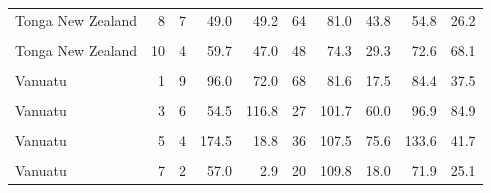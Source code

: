 \begin{ThreePartTable}
\begin{longtable}[t]{lrrrrrrrrr}
Tonga New Zealand & 8 & 7 & 49.0 & 49.2 & 64 & 81.0 & 43.8 & 54.8 & 26.2\\
\cellcolor{gray!6}{Tonga New Zealand} & \cellcolor{gray!6}{9} & \cellcolor{gray!6}{4} & \cellcolor{gray!6}{31.1} & \cellcolor{gray!6}{23.2} & \cellcolor{gray!6}{58} & \cellcolor{gray!6}{73.8} & \cellcolor{gray!6}{34.8} & \cellcolor{gray!6}{47.5} & \cellcolor{gray!6}{36.2}\\
Tonga New Zealand & 10 & 4 & 59.7 & 47.0 & 48 & 74.3 & 29.3 & 72.6 & 68.1\\
\cellcolor{gray!6}{Tonga New Zealand} & \cellcolor{gray!6}{11} & \cellcolor{gray!6}{5} & \cellcolor{gray!6}{31.8} & \cellcolor{gray!6}{19.7} & \cellcolor{gray!6}{52} & \cellcolor{gray!6}{79.3} & \cellcolor{gray!6}{33.4} & \cellcolor{gray!6}{57.3} & \cellcolor{gray!6}{34.9}\\
Vanuatu & 1 & 9 & 96.0 & 72.0 & 68 & 81.6 & 17.5 & 84.4 & 37.5\\
\cellcolor{gray!6}{Vanuatu} & \cellcolor{gray!6}{2} & \cellcolor{gray!6}{4} & \cellcolor{gray!6}{91.4} & \cellcolor{gray!6}{32.7} & \cellcolor{gray!6}{47} & \cellcolor{gray!6}{103.9} & \cellcolor{gray!6}{56.5} & \cellcolor{gray!6}{78.4} & \cellcolor{gray!6}{59.7}\\
Vanuatu & 3 & 6 & 54.5 & 116.8 & 27 & 101.7 & 60.0 & 96.9 & 84.9\\
\cellcolor{gray!6}{Vanuatu} & \cellcolor{gray!6}{4} & \cellcolor{gray!6}{3} & \cellcolor{gray!6}{125.0} & \cellcolor{gray!6}{9.5} & \cellcolor{gray!6}{34} & \cellcolor{gray!6}{110.8} & \cellcolor{gray!6}{67.7} & \cellcolor{gray!6}{119.4} & \cellcolor{gray!6}{86.9}\\
Vanuatu & 5 & 4 & 174.5 & 18.8 & 36 & 107.5 & 75.6 & 133.6 & 41.7\\
\cellcolor{gray!6}{Vanuatu} & \cellcolor{gray!6}{6} & \cellcolor{gray!6}{2} & \cellcolor{gray!6}{123.0} & \cellcolor{gray!6}{18.0} & \cellcolor{gray!6}{30} & \cellcolor{gray!6}{118.1} & \cellcolor{gray!6}{48.1} & \cellcolor{gray!6}{109.9} & \cellcolor{gray!6}{29.9}\\
Vanuatu & 7 & 2 & 57.0 & 2.9 & 20 & 109.8 & 18.0 & 71.9 & 25.1\\*
\end{longtable}
\end{ThreePartTable}
\endgroup{}

\endgroup

\cleardoublepage


\hypertarget{section-2}{%
\chapter{}\label{section-2}}

